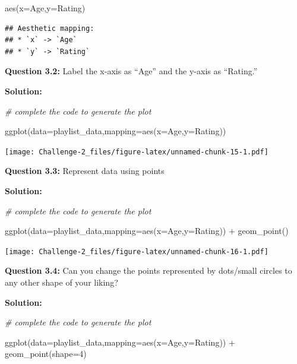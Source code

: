 \documentclass[
]{article}
\newenvironment{Shaded}{\begin{snugshade}}{\end{snugshade}}
\newcommand{\AttributeTok}[1]{\textcolor[rgb]{0.77,0.63,0.00}{#1}}
\newcommand{\CommentTok}[1]{\textcolor[rgb]{0.56,0.35,0.01}{\textit{#1}}}
\newcommand{\DecValTok}[1]{\textcolor[rgb]{0.00,0.00,0.81}{#1}}
\newcommand{\FunctionTok}[1]{\textcolor[rgb]{0.00,0.00,0.00}{#1}}
\newcommand{\NormalTok}[1]{#1}
\newcommand{\SpecialCharTok}[1]{\textcolor[rgb]{0.00,0.00,0.00}{#1}}
\begin{document}
\begin{Shaded}
\begin{Highlighting}[]
\FunctionTok{aes}\NormalTok{(}\AttributeTok{x=}\NormalTok{Age,}\AttributeTok{y=}\NormalTok{Rating)}
\end{Highlighting}
\end{Shaded}

\begin{verbatim}
## Aesthetic mapping: 
## * `x` -> `Age`
## * `y` -> `Rating`
\end{verbatim}

\textbf{Question 3.2:} Label the x-axis as ``Age'' and the y-axis as
``Rating.''

\textbf{Solution:}

\begin{Shaded}
\begin{Highlighting}[]
\CommentTok{\# complete the code to generate the plot}

\FunctionTok{ggplot}\NormalTok{(}\AttributeTok{data=}\NormalTok{playlist\_data,}\AttributeTok{mapping=}\FunctionTok{aes}\NormalTok{(}\AttributeTok{x=}\NormalTok{Age,}\AttributeTok{y=}\NormalTok{Rating))}
\end{Highlighting}
\end{Shaded}

\texttt{[image: Challenge-2\_files/figure-latex/unnamed-chunk-15-1.pdf]}

\textbf{Question 3.3:} Represent data using points

\textbf{Solution:}

\begin{Shaded}
\begin{Highlighting}[]
\CommentTok{\# complete the code to generate the plot}

\FunctionTok{ggplot}\NormalTok{(}\AttributeTok{data=}\NormalTok{playlist\_data,}\AttributeTok{mapping=}\FunctionTok{aes}\NormalTok{(}\AttributeTok{x=}\NormalTok{Age,}\AttributeTok{y=}\NormalTok{Rating)) }\SpecialCharTok{+} \FunctionTok{geom\_point}\NormalTok{()}
\end{Highlighting}
\end{Shaded}

\texttt{[image: Challenge-2\_files/figure-latex/unnamed-chunk-16-1.pdf]}

\textbf{Question 3.4:} Can you change the points represented by
dots/small circles to any other shape of your liking?

\textbf{Solution:}

\begin{Shaded}
\begin{Highlighting}[]
\CommentTok{\# complete the code to generate the plot}

\FunctionTok{ggplot}\NormalTok{(}\AttributeTok{data=}\NormalTok{playlist\_data,}\AttributeTok{mapping=}\FunctionTok{aes}\NormalTok{(}\AttributeTok{x=}\NormalTok{Age,}\AttributeTok{y=}\NormalTok{Rating)) }\SpecialCharTok{+} \FunctionTok{geom\_point}\NormalTok{(}\AttributeTok{shape=}\DecValTok{4}\NormalTok{) }
\end{Highlighting}
\end{Shaded}
\end{document}
